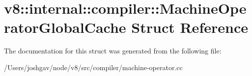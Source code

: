 \hypertarget{structv8_1_1internal_1_1compiler_1_1_machine_operator_global_cache}{}\section{v8\+:\+:internal\+:\+:compiler\+:\+:Machine\+Operator\+Global\+Cache Struct Reference}
\label{structv8_1_1internal_1_1compiler_1_1_machine_operator_global_cache}


The documentation for this struct was generated from the following file\+:\begin{DoxyCompactItemize}
\item 
/\+Users/joshgav/node/v8/src/compiler/machine-\/operator.\+cc\end{DoxyCompactItemize}
